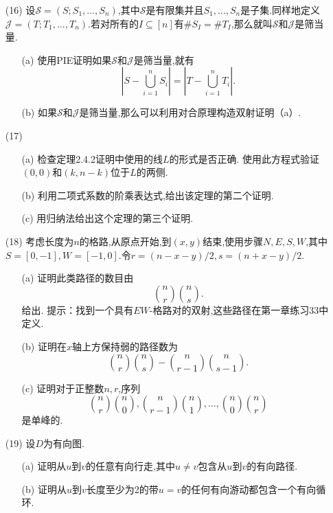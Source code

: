 \documentclass{ctexbook}
\begin{document}
\begin{enumerate}
	\item[(16)]设$\mathcal{S}=(S;S_1,\dots,S_n)$,其中$\mathcal{S}$是有限集并且$S_1,\dots,S_n$是子集.同样地定义$\mathcal{J}=(T;T_1,\dots,T_n)$.若对所有的$I\subseteq[n]$有$\#S_I=\#T_I$,那么就叫$\mathcal{S}$和$\mathcal{J}$是筛当量. 
	\begin{enumerate}
		\item[(a)] 使用PIE证明如果$\mathcal{S}$和$\mathcal{J}$是筛当量,就有
		$$
		\left|S-\bigcup_{i=1}^nS_i\right|=\left|T-\bigcup_{i=1}^nT_i	\right|.
		$$
		\item[(b)] 如果$\mathcal{S}$和$\mathcal{J}$是筛当量,那么可以利用对合原理构造双射证明（a）. 
	\end{enumerate}
\end{enumerate}


\begin{enumerate}
	\item[(17)]
	\begin{enumerate}
		\item[(a)] 检查定理2.4.2证明中使用的线$L$的形式是否正确. 	
		使用此方程式验证$(0,0)$和$(k,n-k)$位于$L$的两侧. 
		\item[(b)] 利用二项式系数的阶乘表达式,给出该定理的第二个证明. 
		\item[(c)] 用归纳法给出这个定理的第三个证明. 
	\end{enumerate}
\end{enumerate}


\begin{enumerate}
	\item[(18)]  考虑长度为$n$的格路,从原点开始,到$(x,y)$结束,使用步骤$N,E,S,W$,其中$S=[0,-1],W=[-1,0]$.令$r=(n-x-y)/2,s=(n+x-y)/2$.
	\begin{enumerate}
		\item[(a)] 证明此类路径的数目由
		$$\binom{n}{r}\binom{n}{s}.$$
		给出. 	
		提示：找到一个具有$EW$-格路对的双射,这些路径在第一章练习33中定义. 
		\item[(b)]证明在$x$轴上方保持弱的路径数为
		$$\binom{n}{r}\binom{n}{s}-\binom{n}{r-1}\binom{n}{s-1}.$$
		\item[(c)] 证明对于正整数$n,r$,序列
		$$\binom{n}{r}\binom{n}{0},\binom{n}{r-1}\binom{n}{1},\dots,\binom{n}{0}\binom{n}{r}$$	
		是单峰的. 
	\end{enumerate}
\end{enumerate}



\begin{enumerate}
	\item[(19)]设$D$为有向图. 
	\begin{enumerate}
		\item[(a)] 证明从$u$到$v$的任意有向行走,其中$u\ne v$包含从$u$到$v$的有向路径.
		\item[(b)] 证明从$u$到$v$长度至少为2的带$u=v$的任何有向游动都包含一个有向循环. 
	\end{enumerate}
\end{enumerate}
\end{document}
